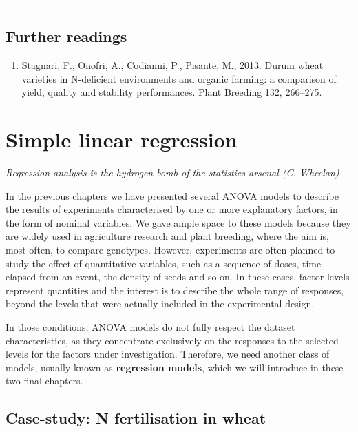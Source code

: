 \documentclass[a4paper,12pt,oneside]{book}
\providecommand{\tightlist}{%
  \setlength{\itemsep}{0pt}\setlength{\parskip}{0pt}}
\begin{document}
\begin{center}\rule{0.5\linewidth}{0.5pt}\end{center}

\hypertarget{further-readings-8}{%
\section{Further readings}\label{further-readings-8}}

\begin{enumerate}
\def\labelenumi{\arabic{enumi}.}
\tightlist
\item
  Stagnari, F., Onofri, A., Codianni, P., Pisante, M., 2013. Durum wheat varieties in N-deficient environments and organic farming: a comparison of yield, quality and stability performances. Plant Breeding 132, 266--275.
\end{enumerate}

\hypertarget{simple-linear-regression}{%
\chapter{Simple linear regression}\label{simple-linear-regression}}

\emph{Regression analysis is the hydrogen bomb of the statistics arsenal (C. Wheelan)}

In the previous chapters we have presented several ANOVA models to describe the results of experiments characterised by one or more explanatory factors, in the form of nominal variables. We gave ample space to these models because they are widely used in agriculture research and plant breeding, where the aim is, most often, to compare genotypes. However, experiments are often planned to study the effect of quantitative variables, such as a sequence of doses, time elapsed from an event, the density of seeds and so on. In these cases, factor levels represent quantities and the interest is to describe the whole range of responses, beyond the levels that were actually included in the experimental design.

In those conditions, ANOVA models do not fully respect the dataset characteristics, as they concentrate exclusively on the responses to the selected levels for the factors under investigation. Therefore, we need another class of models, usually known as \textbf{regression models}, which we will introduce in these two final chapters.

\hypertarget{case-study-n-fertilisation-in-wheat}{%
\section{Case-study: N fertilisation in wheat}\label{case-study-n-fertilisation-in-wheat}}
\end{document}

